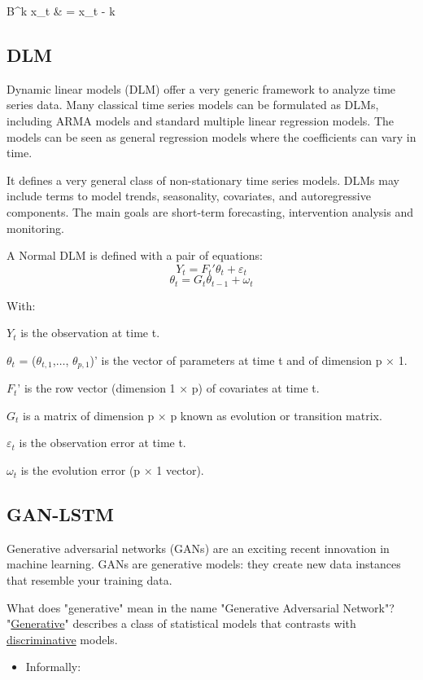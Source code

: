 \documentclass{ieeeojies}
\begin{document}
    \hspace{0.3cm} B^k x_t & = x_t - k
\subsection{DLM}
\hspace{0.3cm}Dynamic linear models (DLM) offer a very generic
framework to analyze time series data. Many classical time
series models can be formulated as DLMs, including ARMA
models and standard multiple linear regression models. The
models can be seen as general regression models where the
coefficients can vary in time.

It defines a very general class of non-stationary time series
models. DLMs may include terms to model trends, seasonality,
covariates, and autoregressive components. The main goals
are short-term forecasting, intervention analysis and
monitoring. 

A Normal DLM is defined with a pair of equations:
\[ Y_t = F_t' \theta_t + \varepsilon_t \]
\[ \theta_t = G_t \theta_{t-1} + \omega_t \]

With:


$Y_t$ is the observation at time t.

$\theta_t$ = ($\theta_{t,1}$,$ \ldots$, $\theta_{p,1}$)' is the vector of parameters at time t and of dimension p × 1.

$F_t$' is the row vector (dimension 1 × p) of covariates at time t.

$G_t$ is a matrix of dimension p × p known as evolution or transition matrix.

$\varepsilon_t$ is the observation error at time t. 

$\omega_t$ is the evolution error (p × 1 vector).

\subsection{GAN-LSTM}

\hspace{0.3cm}Generative adversarial networks (GANs) are an exciting
recent innovation in machine learning. GANs are generative
models: they create new data instances that resemble your
training data.

What does "generative" mean in the name "Generative
Adversarial Network"? "\underline{Generative}" describes a class of
statistical models that contrasts with \underline{discriminative} models.
\begin{itemize}
    \item Informally:
\end{itemize}
\end{document}
